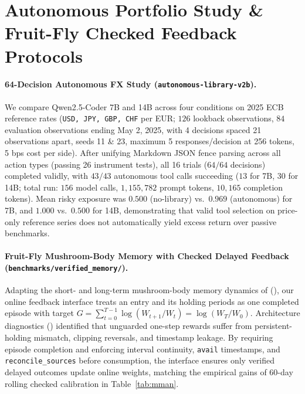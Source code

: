 \section{Autonomous Portfolio Study \& Fruit-Fly Checked Feedback Protocols}
\label{app:autonomous}
\label{app:fly}
\paragraph{64-Decision Autonomous FX Study (\texttt{autonomous-library-v2b}).}
We compare Qwen2.5-Coder 7B and 14B across four conditions on 2025 ECB reference rates (\texttt{USD, JPY, GBP, CHF} per EUR; $126$ lookback observations, $84$ evaluation observations ending May 2, 2025, with 4 decisions spaced 21 observations apart, seeds 11 \& 23, maximum 5 responses/decision at 256 tokens, 5 bps cost per side). After unifying Markdown JSON fence parsing across all action types (passing 26 instrument tests), all 16 trials ($64/64$ decisions) completed validly, with $43/43$ autonomous tool calls succeeding ($13$ for 7B, $30$ for 14B; total run: $156$ model calls, $1{,}155{,}782$ prompt tokens, $10{,}165$ completion tokens). Mean risky exposure was $0.500$ (no-library) vs.\ $0.969$ (autonomous) for 7B, and $1.000$ vs.\ $0.500$ for 14B, demonstrating that valid tool selection on price-only reference series does not automatically yield excess return over passive benchmarks.

\paragraph{Fruit-Fly Mushroom-Body Memory with Checked Delayed Feedback (\texttt{benchmarks/verified\_memory/}).}
Adapting the short- and long-term mushroom-body memory dynamics of \citet{huang2024memory} (), our online feedback interface treats an entry and its holding periods as one completed episode with target $G = \sum_{t=0}^{T-1}\log(W_{t+1}/W_t) = \log(W_T/W_0)$. Architecture diagnostics () identified that unguarded one-step rewards suffer from persistent-holding mismatch, clipping reversals, and timestamp leakage. By requiring episode completion and enforcing interval continuity, \texttt{avail} timestamps, and \texttt{reconcile\_sources} before consumption, the interface ensures only verified delayed outcomes update online weights, matching the empirical gains of 60-day rolling checked calibration in Table~\ref{tab:mman}.


